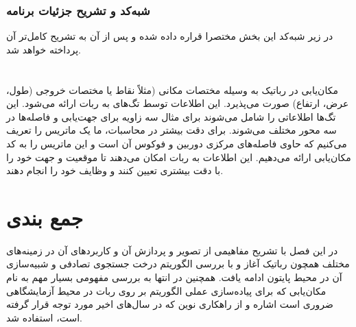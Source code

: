 \subsubsection{شبه‌کد و تشریح جزئیات برنامه}

در زیر شبه‌کد این بخش مختصرا قراره داده شده و پس از آن به تشریح کامل‌تر آن پرداخته خواهد شد.
\section*{}
\begin{latin}
	
\end{latin}

مکان‌یابی در رباتیک به وسیله مختصات مکانی (مثلاً نقاط
یا مختصات خروجی (طول، عرض، ارتفاع) صورت می‌پذیرد. این اطلاعات توسط تگ‌های
به ربات ارائه می‌شود. این تگ‌ها اطلاعاتی را شامل می‌شوند برای مثال سه زاویه
برای جهت‌یابی و فاصله‌ها در سه محور مختلف می‌شوند. برای دقت بیشتر در محاسبات، ما یک ماتریس را تعریف می‌کنیم که حاوی فاصله‌های مرکزی دوربین و فوکوس آن است و این ماتریس را به کد مکان‌یابی ارائه می‌دهیم. این اطلاعات به ربات امکان می‌دهند تا موقعیت و جهت خود را با دقت بیشتری تعیین کنند و وظایف خود را انجام دهند.
\section*{}
\begin{latin}
	
\end{latin}



\section{جمع بندی}
در این فصل با تشریح مفاهیمی از تصویر و پردازش آن و کاربرد‌های آن در زمینه‌های مختلف همچون رباتیک آغاز و با بررسی الگوریتم درخت جستجوی تصادفی و شبیه‌سازی آن در محیط پایتون ادامه یافت. همچنین در انتها به بررسی مفهومی بسیار مهم به نام مکان‌یابی که برای پیاده‌سازی عملی الگوریتم بر روی ربات در محیط آزمایشگاهی ضروری است اشاره و از راهکاری نوین که در سال‌های اخیر مورد توجه قرار گرفته است، استفاده شد.
